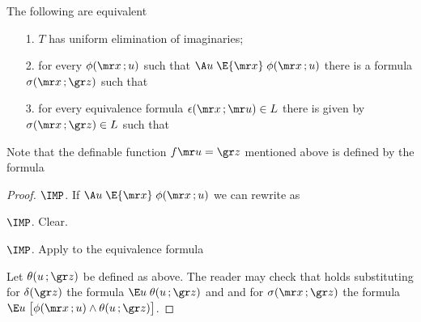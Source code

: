\begin{proposition}\label{prop_uei_standard}
The following are equivalent
\begin{itemize}
\item[1.] $T$ has uniform elimination of imaginaries;
\end{itemize}
\begin{itemize}
\item[2.] for every $\phi({\mr x}\,;u)$ such that  $\A u\;\E{\mr x}\;\phi({\mr x}\,;u)$ there is a formula $\sigma({\mr x}\,;{\gr z})$ such that 
\end{itemize}


\begin{itemize}
\item[3.] for every equivalence formula $\epsilon({\mr x}\,;{\mr u})\in L$ there is given by $\sigma({\mr x}\,;{\gr z})\in L$ such that
\end{itemize}



\end{proposition}

Note that the definable function $f{\mr u}={\gr z}$ mentioned above is defined by the formula 


\begin{proof}
$\IMP$.
If $\A u\;\E{\mr x}\;\phi({\mr x}\,;u)$ we can rewrite  as 


$\IMP$.
Clear.

$\IMP$.
Apply  to the equivalence formula


Let $\theta(u\,;{\gr z})$ be defined as above.
The reader may check that  holds substituting for $\delta({\gr z})$ the formula $\E u\;\theta(u\,;{\gr z})$ and and for $\sigma({\mr x}\,;{\gr z})$ the formula $\E u\;\big[\phi({\mr x}\,;u)\wedge\theta(u\,;{\gr z})\big]$.
\end{proof}

